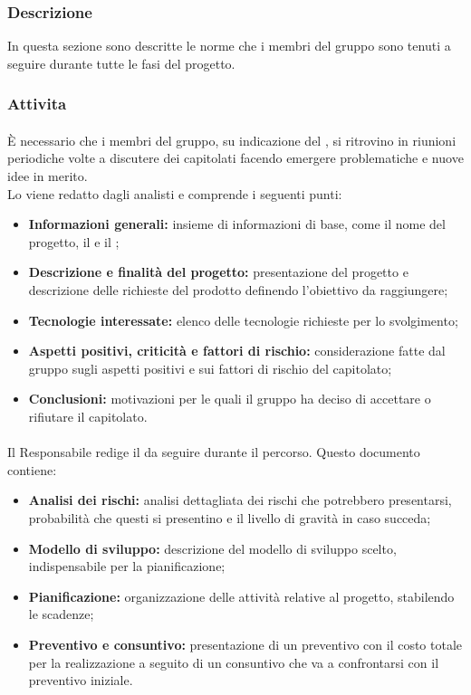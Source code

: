 \subsubsection{Descrizione}
In questa sezione sono descritte le norme che i membri del gruppo \Omicron{} sono tenuti a seguire durante tutte le fasi del progetto.
\subsubsection{Attivita}
\paragraph{\SdF}
È necessario che i membri del gruppo, su indicazione del \respProg, si ritrovino in riunioni periodiche volte a discutere dei capitolati facendo emergere problematiche e nuove idee in merito.\\
Lo \SdFv viene redatto dagli analisti e comprende i seguenti punti:
\begin{itemize}
    \item \textbf{Informazioni generali:} insieme di informazioni di base, come il nome del progetto, il \proponProg{} e il \commitProg{};
    \item \textbf{Descrizione e finalità del progetto:} presentazione del progetto e descrizione delle richieste del prodotto definendo l'obiettivo da raggiungere;
    \item \textbf{Tecnologie interessate:} elenco delle tecnologie richieste per lo svolgimento;
    \item \textbf{Aspetti positivi, criticità e fattori di rischio:} considerazione fatte dal gruppo sugli aspetti positivi e sui fattori di rischio del capitolato;
    \item \textbf{Conclusioni:} motivazioni per le quali il gruppo ha deciso di accettare o rifiutare il capitolato.
\end{itemize}
\paragraph{\PdP} Il Responsabile redige il \PdPv{} da seguire durante il percorso. Questo documento contiene:
\begin{itemize}
    \item \textbf{Analisi dei rischi:} analisi dettagliata dei rischi che potrebbero presentarsi, probabilità che questi si presentino e il livello di gravità in caso succeda;
    
    \item \textbf{Modello di sviluppo:} descrizione del modello di sviluppo scelto, indispensabile per la pianificazione;
    
    \item \textbf{Pianificazione:} organizzazione delle attività relative al progetto, stabilendo le scadenze;
    
    \item \textbf{Preventivo e consuntivo:} presentazione di un preventivo con il costo totale per la realizzazione a seguito di un consuntivo che va a confrontarsi con il preventivo iniziale.
\end{itemize}

